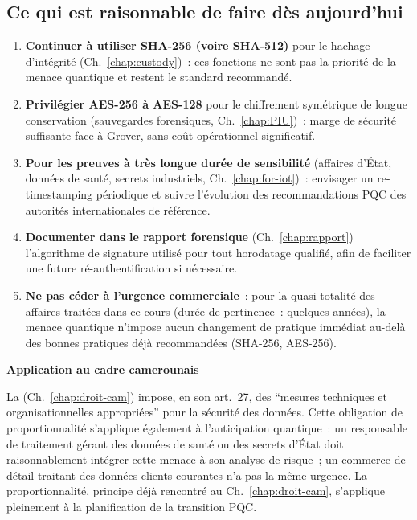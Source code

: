 \subsection{Ce qui est raisonnable de faire dès aujourd'hui}

\begin{enumerate}
    \item \textbf{Continuer à utiliser SHA-256 (voire SHA-512)}
          pour le hachage d'intégrité (Ch.~\ref{chap:custody})~:
          ces fonctions ne sont pas la priorité de la menace
          quantique et restent le standard recommandé.
    \item \textbf{Privilégier AES-256 à AES-128} pour le chiffrement
          symétrique de longue conservation (sauvegardes
          forensiques, Ch.~\ref{chap:PIU})~: marge de sécurité
          suffisante face à Grover, sans coût opérationnel
          significatif.
    \item \textbf{Pour les preuves à très longue durée de
          sensibilité} (affaires d'État, données de santé,
          secrets industriels, Ch.~\ref{chap:for-iot})~: envisager
          un re-timestamping périodique et suivre l'évolution
          des recommandations PQC des autorités internationales
          de référence.
    \item \textbf{Documenter dans le rapport forensique}
          (Ch.~\ref{chap:rapport}) l'algorithme de signature
          utilisé pour tout horodatage qualifié, afin de faciliter
          une future ré-authentification si nécessaire.
    \item \textbf{Ne pas céder à l'urgence commerciale}~: pour
          la quasi-totalité des affaires traitées dans ce cours
          (durée de pertinence~: quelques années), la menace
          quantique n'impose aucun changement de pratique immédiat
          au-delà des bonnes pratiques déjà recommandées
          (SHA-256, AES-256).
\end{enumerate}

\begin{boxjuris}
\textbf{Application au cadre camerounais}

La  (Ch.~\ref{chap:droit-cam}) impose, en son
art.~27, des ``mesures techniques et organisationnelles
appropriées'' pour la sécurité des données. Cette obligation
de proportionnalité s'applique également à l'anticipation
quantique~: un responsable de traitement gérant des données de
santé ou des secrets d'État doit raisonnablement intégrer cette
menace à son analyse de risque~; un commerce de détail traitant
des données clients courantes n'a pas la même urgence. La
proportionnalité, principe déjà rencontré au Ch.~\ref{chap:droit-cam},
s'applique pleinement à la planification de la transition PQC.
\end{boxjuris}

